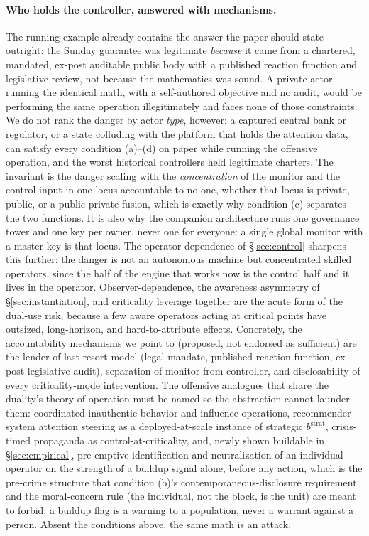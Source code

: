 \documentclass[11pt]{article}
\begin{document}
\paragraph{Who holds the controller, answered with mechanisms.} The running example already contains the answer the paper should state outright: the Sunday guarantee was legitimate \emph{because} it came from a chartered, mandated, ex-post auditable public body with a published reaction function and legislative review, not because the mathematics was sound. A private actor running the identical math, with a self-authored objective and no audit, would be performing the same operation illegitimately and faces none of those constraints. We do not rank the danger by actor \emph{type}, however: a captured central bank or regulator, or a state colluding with the platform that holds the attention data, can satisfy every condition (a)--(d) on paper while running the offensive operation, and the worst historical controllers held legitimate charters. The invariant is the danger scaling with the \emph{concentration} of the monitor and the control input in one locus accountable to no one, whether that locus is private, public, or a public-private fusion, which is exactly why condition (c) separates the two functions. It is also why the companion architecture runs one governance tower and one key per owner, never one for everyone: a single global monitor with a master key is that locus. The operator-dependence of \S\ref{sec:control} sharpens this further: the danger is not an autonomous machine but concentrated skilled operators, since the half of the engine that works now is the control half and it lives in the operator. Observer-dependence, the awareness asymmetry of \S\ref{sec:instantiation}, and criticality leverage together are the acute form of the dual-use risk, because a few aware operators acting at critical points have outsized, long-horizon, and hard-to-attribute effects. Concretely, the accountability mechanisms we point to (proposed, not endorsed as sufficient) are the lender-of-last-resort model (legal mandate, published reaction function, ex-post legislative audit), separation of monitor from controller, and disclosability of every criticality-mode intervention. The offensive analogues that share the duality's theory of operation must be named so the abstraction cannot launder them: coordinated inauthentic behavior and influence operations, recommender-system attention steering as a deployed-at-scale instance of strategic $b^{\mathrm{strat}}$, crisis-timed propaganda as control-at-criticality, and, newly shown buildable in \S\ref{sec:empirical}, pre-emptive identification and neutralization of an individual operator on the strength of a buildup signal alone, before any action, which is the pre-crime structure that condition (b)'s contemporaneous-disclosure requirement and the moral-concern rule (the individual, not the block, is the unit) are meant to forbid: a buildup flag is a warning to a population, never a warrant against a person. Absent the conditions above, the same math is an attack.
\end{document}
